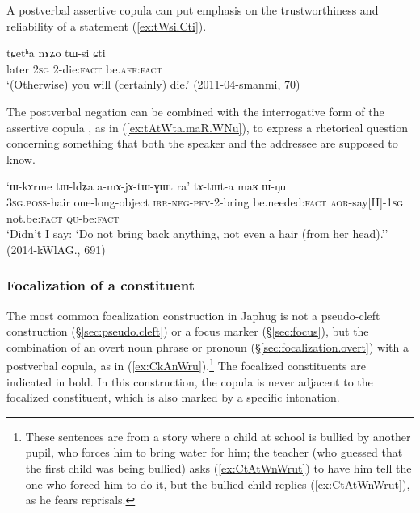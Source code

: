 A postverbal assertive copula can put emphasis on the trustworthiness and reliability of a statement  (\ref{ex:tWsi.Cti}).

\begin{exe}
\ex \label{ex:tWsi.Cti}
\gll  tɕetʰa nɤʑo tɯ-si ɕti \\
later \textsc{2sg} 2-die:\textsc{fact} be.\textsc{aff}:\textsc{fact} \\
\glt `(Otherwise) you will (certainly) die.' (2011-04-smanmi, 70)
\end{exe}

The postverbal negation  can be combined with the interrogative form of the assertive copula , as in (\ref{ex:tAtWta.maR.WNu}), to express a rhetorical question concerning something that both the speaker and the addressee are supposed to know.

\begin{exe}
\ex \label{ex:tAtWta.maR.WNu}
\gll `ɯ-kɤrme tɯ-ldʑa a-mɤ-jɤ-tɯ-ɣɯt ra' tɤ-tɯt-a maʁ ɯ́-ŋu \\
\textsc{3sg}.\textsc{poss}-hair one-long-object \textsc{irr}-\textsc{neg}-\textsc{pfv}-2-bring be.needed:\textsc{fact} \textsc{aor}-say[II]-\textsc{1sg} not.be:\textsc{fact} \textsc{qu}-be:\textsc{fact} \\
\glt `Didn't I say: `Do not bring back anything, not even a hair (from her head).'' (2014-kWlAG., 691)
\end{exe}

\subsubsection{Focalization of a constituent} \label{sec:focalization.final.copula}
The most common focalization construction in Japhug is not a pseudo-cleft construction (§\ref{sec:pseudo.cleft}) or a focus marker (§\ref{sec:focus}), but the combination of an overt noun phrase or pronoun (§\ref{sec:focalization.overt}) with a postverbal copula, as in (\ref{ex:CkAnWru}).\footnote{These sentences are from a story where a child at school is bullied by another pupil, who forces him to bring water for him; the teacher (who guessed that the first child was being bullied) asks (\ref{ex:CtAtWnWrut}) to have him tell the one who forced him to do it, but the bullied child replies (\ref{ex:CtAtWnWrut}), as he fears reprisals.} The focalized constituents are indicated in bold. In this construction, the copula is never adjacent to the focalized constituent, which is also marked by a specific intonation. 

